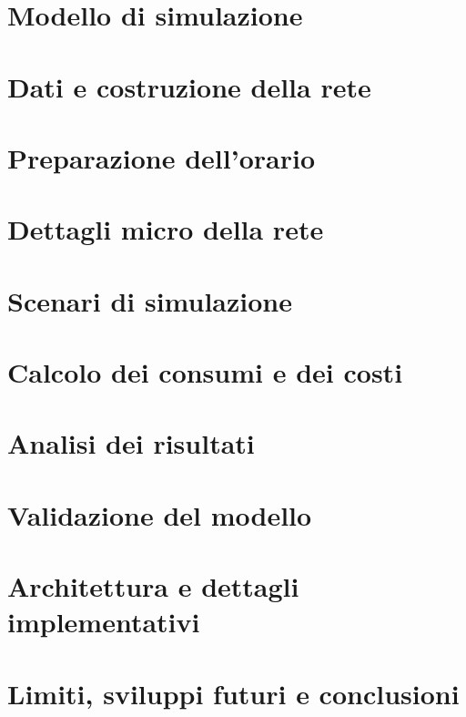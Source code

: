 \documentclass[11pt,a4paper]{article}
\begin{document}
\section{Modello di simulazione}


\section{Dati e costruzione della rete}


\section{Preparazione dell'orario}
\label{sec:orari}


\section{Dettagli micro della rete}
\label{sec:dettagli-rete}


\section{Scenari di simulazione}


\section{Calcolo dei consumi e dei costi}
\label{sec:costi}


\section{Analisi dei risultati}
\label{sec:analisi}


\section{Validazione del modello}
\label{sec:validazione}


\section{Architettura e dettagli implementativi}
\label{sec:architettura}


\section{Limiti, sviluppi futuri e conclusioni}

\end{document}
